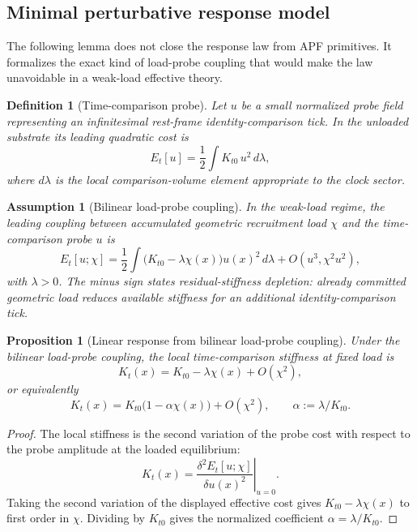 \documentclass[11pt]{article}
\newtheorem{proposition}[theorem]{Proposition}
\newtheorem{definition}[theorem]{Definition}
\newtheorem{assumption}[theorem]{Assumption}
\theoremstyle{remark}
\begin{document}
\subsection{Minimal perturbative response model}

The following lemma does not close the response law from APF primitives.  It formalizes the exact kind of load-probe coupling that would make the law unavoidable in a weak-load effective theory.

\begin{definition}[Time-comparison probe]
Let \(u\) be a small normalized probe field representing an infinitesimal rest-frame identity-comparison tick.  In the unloaded substrate its leading quadratic cost is
\[
        E_t[u]=\frac12\int K_{t0}\,u^2\,d\lambda,
\]
where \(d\lambda\) is the local comparison-volume element appropriate to the clock sector.
\end{definition}

\begin{assumption}[Bilinear load-probe coupling]
In the weak-load regime, the leading coupling between accumulated geometric recruitment load \(\chi\) and the time-comparison probe \(u\) is
\[
        E_t[u;\chi]
        =\frac12\int \bigl(K_{t0}-\lambda\chi(x)\bigr)u(x)^2\,d\lambda
        +O(u^3,\chi^2u^2),
\]
with \(\lambda>0\).  The minus sign states residual-stiffness depletion: already committed geometric load reduces available stiffness for an additional identity-comparison tick.
\end{assumption}

\begin{proposition}[Linear response from bilinear load-probe coupling]
\label{prop:response-from-coupling}
Under the bilinear load-probe coupling, the local time-comparison stiffness at fixed load is
\[
        K_t(x)=K_{t0}-\lambda\chi(x)+O(\chi^2),
\]
or equivalently
\[
        K_t(x)=K_{t0}\bigl(1-\alpha\chi(x)\bigr)+O(\chi^2),
        \qquad \alpha:=\lambda/K_{t0}.
\]
\end{proposition}

\begin{proof}
The local stiffness is the second variation of the probe cost with respect to the probe amplitude at the loaded equilibrium:
\[
        K_t(x)=\left.\frac{\delta^2 E_t[u;\chi]}{\delta u(x)^2}\right|_{u=0}.
\]
Taking the second variation of the displayed effective cost gives \(K_{t0}-\lambda\chi(x)\) to first order in \(\chi\).  Dividing by \(K_{t0}\) gives the normalized coefficient \(\alpha=\lambda/K_{t0}\).
\end{proof}
\end{document}
